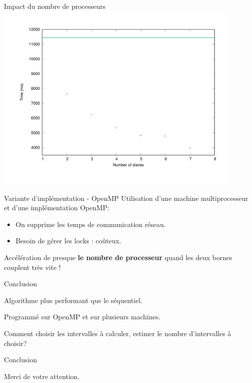 \documentclass[10pt,usenames,dvipsnames]{beamer}
\begin{document}
    \begin{frame}{Impact du nombre de processeurs}
  \centering
    \includegraphics [width=0.9\textwidth]{numberofservers} 
    

  \end{frame}


  \begin{frame}{Variante d'implémentation - OpenMP}
  \centering
  Utilisation d'une machine multiprocesseur et d'une implémentation OpenMP:
  \begin{itemize}
\item On supprime les temps de communication réseau.    
\item Besoin de gérer les locks : coûteux.
   \end{itemize}
\vspace{1cm}
Accélération de presque \textbf{le nombre de processeur} quand les deux bornes couplent très vite !
  \end{frame}

  \begin{frame}{Conclusion}


Algorithme plus performant que le séquentiel.
\vspace{1cm}

Programmé sur OpenMP et sur plusieurs machines.
\vspace{1cm}

Comment choisir les intervalles à calculer, estimer le nombre d'intervalles à choisir?
\end {frame}

  \begin{frame}{Conclusion}

\centering
Merci de votre attention.
\end {frame}
\end{document}
